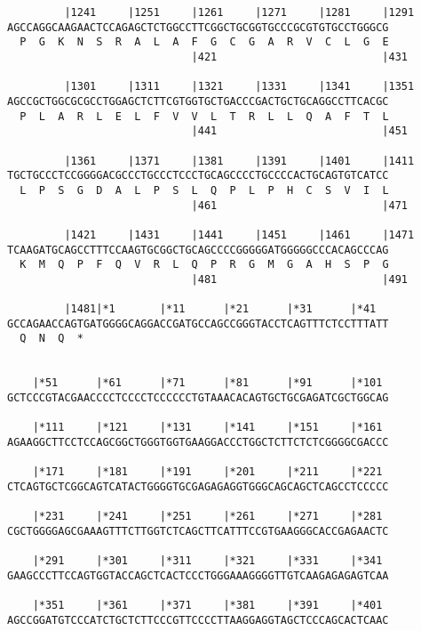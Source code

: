 \documentclass{article}
\begin{document}
\begin{Verbatim}
         |1241     |1251     |1261     |1271     |1281     |1291
AGCCAGGCAAGAACTCCAGAGCTCTGGCCTTCGGCTGCGGTGCCCGCGTGTGCCTGGGCG
  P  G  K  N  S  R  A  L  A  F  G  C  G  A  R  V  C  L  G  E
                             |421                          |431
  
         |1301     |1311     |1321     |1331     |1341     |1351
AGCCGCTGGCGCGCCTGGAGCTCTTCGTGGTGCTGACCCGACTGCTGCAGGCCTTCACGC
  P  L  A  R  L  E  L  F  V  V  L  T  R  L  L  Q  A  F  T  L
                             |441                          |451
  
         |1361     |1371     |1381     |1391     |1401     |1411
TGCTGCCCTCCGGGGACGCCCTGCCCTCCCTGCAGCCCCTGCCCCACTGCAGTGTCATCC
  L  P  S  G  D  A  L  P  S  L  Q  P  L  P  H  C  S  V  I  L
                             |461                          |471
  
         |1421     |1431     |1441     |1451     |1461     |1471
TCAAGATGCAGCCTTTCCAAGTGCGGCTGCAGCCCCGGGGGATGGGGGCCCACAGCCCAG
  K  M  Q  P  F  Q  V  R  L  Q  P  R  G  M  G  A  H  S  P  G
                             |481                          |491
  
         |1481|*1       |*11      |*21      |*31      |*41  
GCCAGAACCAGTGATGGGGCAGGACCGATGCCAGCCGGGTACCTCAGTTTCTCCTTTATT
  Q  N  Q  *   
                                                            
  
    |*51      |*61      |*71      |*81      |*91      |*101 
GCTCCCGTACGAACCCCTCCCCTCCCCCCTGTAAACACAGTGCTGCGAGATCGCTGGCAG
                                                            
    |*111     |*121     |*131     |*141     |*151     |*161 
AGAAGGCTTCCTCCAGCGGCTGGGTGGTGAAGGACCCTGGCTCTTCTCTCGGGGCGACCC
                                                            
    |*171     |*181     |*191     |*201     |*211     |*221 
CTCAGTGCTCGGCAGTCATACTGGGGTGCGAGAGAGGTGGGCAGCAGCTCAGCCTCCCCC
                                                            
    |*231     |*241     |*251     |*261     |*271     |*281 
CGCTGGGGAGCGAAAGTTTCTTGGTCTCAGCTTCATTTCCGTGAAGGGCACCGAGAACTC
                                                            
    |*291     |*301     |*311     |*321     |*331     |*341 
GAAGCCCTTCCAGTGGTACCAGCTCACTCCCTGGGAAAGGGGTTGTCAAGAGAGAGTCAA
                                                            
    |*351     |*361     |*371     |*381     |*391     |*401 
AGCCGGATGTCCCATCTGCTCTTCCCGTTCCCCTTAAGGAGGTAGCTCCCAGCACTCAAC
                                                            

\end{Verbatim}
\end{document}
